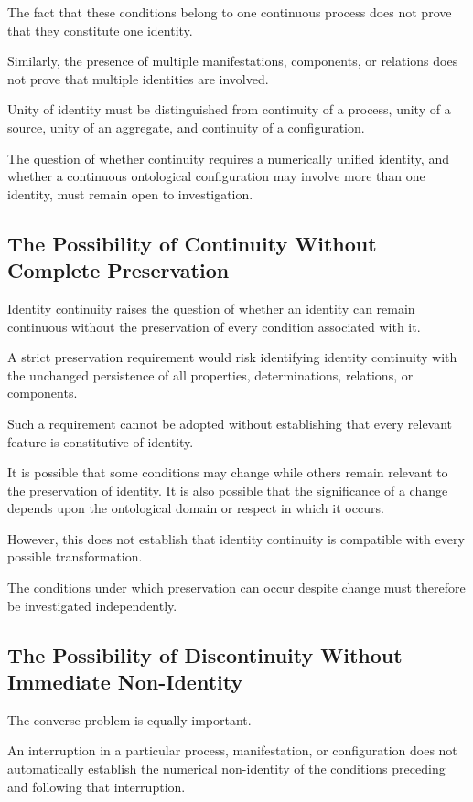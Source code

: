 The fact that these conditions belong to
one continuous process does not prove
that they constitute one identity.

Similarly, the presence of multiple
manifestations, components, or relations
does not prove that multiple identities
are involved.

Unity of identity must be distinguished
from continuity of a process, unity of
a source, unity of an aggregate, and
continuity of a configuration.

The question of whether continuity requires
a numerically unified identity, and whether
a continuous ontological configuration
may involve more than one identity,
must remain open to investigation.

\subsection{The Possibility of Continuity Without Complete Preservation}

Identity continuity raises the question
of whether an identity can remain continuous
without the preservation of every condition
associated with it.

A strict preservation requirement would
risk identifying identity continuity with
the unchanged persistence of all properties,
determinations, relations, or components.

Such a requirement cannot be adopted
without establishing that every relevant
feature is constitutive of identity.

It is possible that some conditions may
change while others remain relevant to
the preservation of identity. It is also
possible that the significance of a change
depends upon the ontological domain or
respect in which it occurs.

However, this does not establish that
identity continuity is compatible with
every possible transformation.

The conditions under which preservation
can occur despite change must therefore
be investigated independently.

\subsection{The Possibility of Discontinuity Without Immediate Non-Identity}

The converse problem is equally important.

An interruption in a particular process,
manifestation, or configuration does not
automatically establish the numerical
non-identity of the conditions preceding
and following that interruption.

